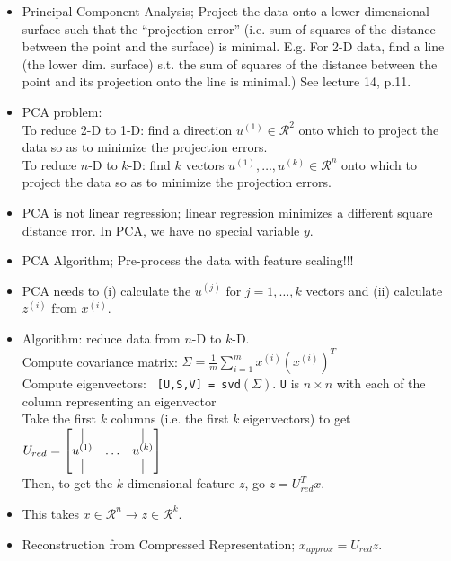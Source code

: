 \documentclass[10pt]{article}
\begin{document}
\begin{itemize}
  \item Principal Component Analysis; Project the data onto a lower dimensional surface such that
    the ``projection error'' (i.e. sum of squares of the distance
    between the point and the surface) is minimal. E.g. For 2-D data,
    find a line (the lower dim. surface) s.t. the sum of squares of
    the distance between the point and its projection onto the line is
    minimal.) See lecture 14, p.11.
  \item PCA problem: \\
    To reduce 2-D to 1-D: find a direction $u^{(1)} \in \mathcal{R}^2$ onto which to project the data so as to minimize the projection errors.\\
    To reduce $n$-D to $k$-D: find $k$ vectors $u^{(1)},\dots,u^{(k)} \in \mathcal{R}^n$ onto which to project the data so as to minimize the projection errors.
  \item PCA is not linear regression; linear regression minimizes a different square distance rror. In PCA, we have no special variable $y$.
  \item PCA Algorithm; Pre-process the data with feature scaling!!!
  \item PCA needs to (i) calculate the $u^{(j)}$ for $j=1,\dots,k$ vectors and (ii) calculate $z^{(i)}$ from $x^{(i)}$.
  \item Algorithm: reduce data from $n$-D to $k$-D. \\
    Compute covariance matrix: $\Sigma = \frac{1}{m}\sum_{i=1}^m x^{(i)}\left( x^{(i)} \right)^T$ \\
    Compute eigenvectors: \texttt{ [U,S,V] = svd}$\left( \Sigma \right)$. \texttt{U} is $n \times n$ with each of the column representing an eigenvector\\
    Take the first $k$ columns (i.e. the first $k$ eigenvectors) to get $U_{red} = \begin{bmatrix} \vline &  & \vline \\ u^{(1)} & \dots & u^{(k)} \\ \vline &  & \vline \end{bmatrix}$ \\
    Then, to get the $k$-dimensional feature $z$, go $z = U_{red}^T x$.
  \item This takes $x \in \mathcal{R}^n \rightarrow z \in \mathcal{R}^k$.
  \item Reconstruction from Compressed Representation; $x_{approx} = U_{red} z$.
\end{itemize}
\end{document}
